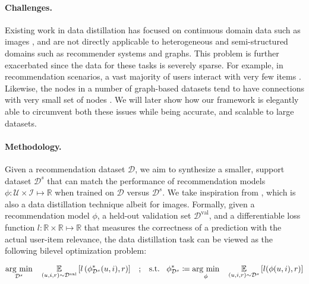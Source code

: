 \documentclass{article}
\begin{document}
\paragraph{Challenges.} Existing work in data distillation has focused on continuous domain data such as images \cite{kip, kip_conv, zhao_dc, zhao_dsa}, and are not directly applicable to heterogeneous and semi-structured domains such as recommender systems and graphs. This problem is further exacerbated since the data for these tasks is severely sparse. For example, in recommendation scenarios, a vast majority of users interact with very few items \cite{pfastre}. Likewise, the nodes in a number of graph-based datasets tend to have connections with very small set of nodes \cite{cold_brew}. We will later show how our \sampler framework is elegantly able to circumvent both these issues while being accurate, and scalable to large datasets.

\paragraph{Methodology.} Given a recommendation dataset $\mathcal{D}$, we aim to synthesize a smaller, support dataset $\mathcal{D}^s$ that can match the performance of recommendation models $\phi : \mathcal{U} \times \mathcal{I} \mapsto \mathbb{R}$ when trained on $\mathcal{D}$ versus $\mathcal{D}^s$. We take inspiration from \cite{kip}, which is also a data distillation technique albeit for images. Formally, given a recommendation model $\phi$, a held-out validation set $\mathcal{D}^{\text{val}}$, and a differentiable loss function $l : \mathbb{R} \times \mathbb{R} \mapsto \mathbb{R}$ that measures the correctness of a prediction with the actual user-item relevance, the data distillation task can be viewed as the following bilevel optimization problem:

\begin{equation} \label{eqn:data_optimization}
    \underset{\mathcal{D}^s}{\operatorname{arg}\,\operatorname{min}}\; \hspace{0.3cm} \underset{(u, i, r) \sim \mathcal{D}^{\text{val}}}{\mathbb{E}} \left[l\left(\phi^*_{\mathcal{D}^s}(u, i), r\right)\right]
    \hspace{0.3cm} ; \hspace{0.3cm}
    \text{s.t.} \hspace{0.3cm} \phi^*_{\mathcal{D}^s} \coloneqq \underset{\phi}{\operatorname{arg}\,\operatorname{min}}\; \hspace{0.3cm} \underset{(u, i, r) \sim \mathcal{D}^s}{\mathbb{E}} \left[l(\phi(u, i), r)\right]
\end{equation}
\end{document}
